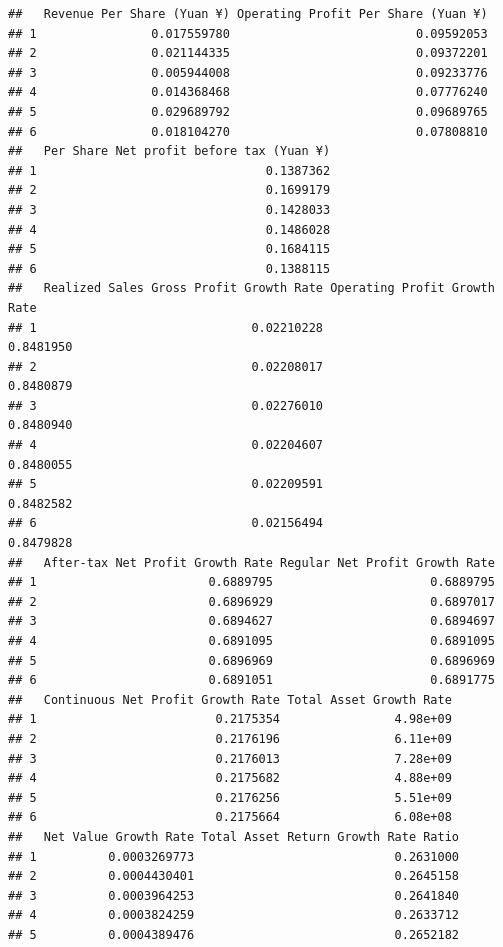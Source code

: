 \documentclass[
]{book}
\begin{document}
\begin{verbatim}
##   Revenue Per Share (Yuan ¥) Operating Profit Per Share (Yuan ¥)
## 1                0.017559780                          0.09592053
## 2                0.021144335                          0.09372201
## 3                0.005944008                          0.09233776
## 4                0.014368468                          0.07776240
## 5                0.029689792                          0.09689765
## 6                0.018104270                          0.07808810
##   Per Share Net profit before tax (Yuan ¥)
## 1                                0.1387362
## 2                                0.1699179
## 3                                0.1428033
## 4                                0.1486028
## 5                                0.1684115
## 6                                0.1388115
##   Realized Sales Gross Profit Growth Rate Operating Profit Growth Rate
## 1                              0.02210228                    0.8481950
## 2                              0.02208017                    0.8480879
## 3                              0.02276010                    0.8480940
## 4                              0.02204607                    0.8480055
## 5                              0.02209591                    0.8482582
## 6                              0.02156494                    0.8479828
##   After-tax Net Profit Growth Rate Regular Net Profit Growth Rate
## 1                        0.6889795                      0.6889795
## 2                        0.6896929                      0.6897017
## 3                        0.6894627                      0.6894697
## 4                        0.6891095                      0.6891095
## 5                        0.6896969                      0.6896969
## 6                        0.6891051                      0.6891775
##   Continuous Net Profit Growth Rate Total Asset Growth Rate
## 1                         0.2175354                4.98e+09
## 2                         0.2176196                6.11e+09
## 3                         0.2176013                7.28e+09
## 4                         0.2175682                4.88e+09
## 5                         0.2176256                5.51e+09
## 6                         0.2175664                6.08e+08
##   Net Value Growth Rate Total Asset Return Growth Rate Ratio
## 1          0.0003269773                            0.2631000
## 2          0.0004430401                            0.2645158
## 3          0.0003964253                            0.2641840
## 4          0.0003824259                            0.2633712
## 5          0.0004389476                            0.2652182

\end{verbatim}
\end{document}
